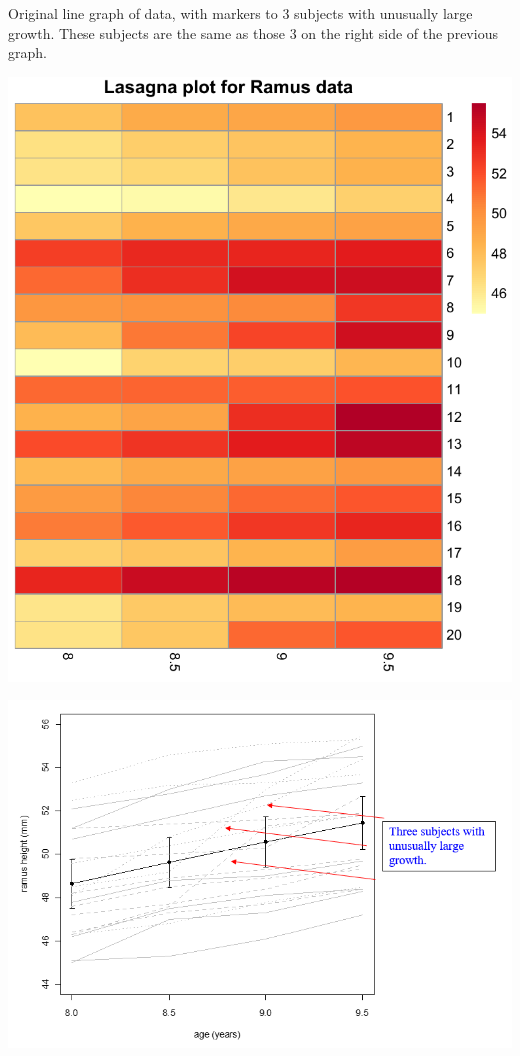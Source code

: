 \documentclass[
  9pt,
  ignorenonframetext,
]{beamer}
\begin{document}
\begin{frame}{}
\protect\hypertarget{section-18}{}
Original line graph of data, with markers to 3 subjects with unusually
large growth. These subjects are the same as those 3 on the right side
of the previous graph.

\tiny

\begin{center}\includegraphics[width=0.6\linewidth]{figs_L2/unnamed-chunk-12-1} \end{center}

\begin{center}\includegraphics[width=0.6\linewidth]{figs_L2/f23} \end{center}

\tiny
\end{frame}
\end{document}
